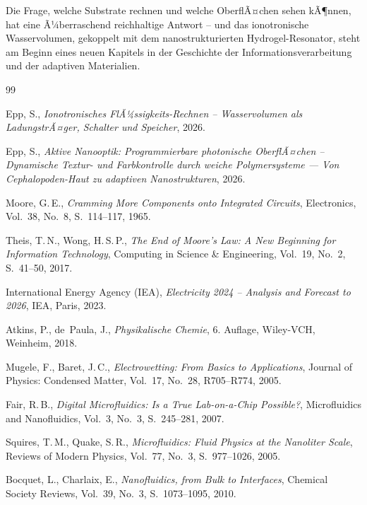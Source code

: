 ﻿\documentclass[a4paper,12pt]{scrreprt}
\theoremstyle{definition}
\begin{document}
Die Frage, welche Substrate rechnen und welche OberflÃ¤chen sehen kÃ¶nnen,
hat eine Ã¼berraschend reichhaltige Antwort -- und das ionotronische
Wasservolumen, gekoppelt mit dem nanostrukturierten Hydrogel-Resonator,
steht am Beginn eines neuen Kapitels in der Geschichte der Informationsverarbeitung
und der adaptiven Materialien.

\begin{thebibliography}{99}

  Epp, S.,
  \textit{Ionotronisches FlÃ¼ssigkeits-Rechnen -- Wasservolumen als LadungstrÃ¤ger, Schalter und Speicher},
  2026.
  
  Epp, S.,
  \textit{Aktive Nanooptik: Programmierbare photonische OberflÃ¤chen -- Dynamische Textur- und Farbkontrolle durch weiche Polymersysteme --- Von Cephalopoden-Haut zu adaptiven Nanostrukturen},
  2026.
  
  Moore, G.\,E.,
  \textit{Cramming More Components onto Integrated Circuits},
  Electronics, Vol.~38, No.~8, S.~114--117, 1965.

  Theis, T.\,N., Wong, H.\,S.\,P.,
  \textit{The End of Moore's Law: A New Beginning for Information Technology},
  Computing in Science \& Engineering, Vol.~19, No.~2, S.~41--50, 2017.

  International Energy Agency (IEA),
  \textit{Electricity 2024 -- Analysis and Forecast to 2026},
  IEA, Paris, 2023.

  Atkins, P., de~Paula, J.,
  \textit{Physikalische Chemie},
  6. Auflage, Wiley-VCH, Weinheim, 2018.

  Mugele, F., Baret, J.\,C.,
  \textit{Electrowetting: From Basics to Applications},
  Journal of Physics: Condensed Matter, Vol.~17, No.~28, R705--R774, 2005.

  Fair, R.\,B.,
  \textit{Digital Microfluidics: Is a True Lab-on-a-Chip Possible?},
  Microfluidics and Nanofluidics, Vol.~3, No.~3, S.~245--281, 2007.

  Squires, T.\,M., Quake, S.\,R.,
  \textit{Microfluidics: Fluid Physics at the Nanoliter Scale},
  Reviews of Modern Physics, Vol.~77, No.~3, S.~977--1026, 2005.

  Bocquet, L., Charlaix, E.,
  \textit{Nanofluidics, from Bulk to Interfaces},
  Chemical Society Reviews, Vol.~39, No.~3, S.~1073--1095, 2010.


\end{thebibliography}
\end{document}
